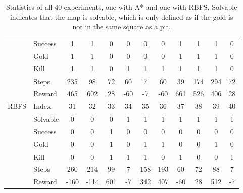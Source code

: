 \begin{table}[!h]
{\begin{tabular}{|l|l|c|c|c|c|c|c|c|c|c|c|}
		 & Success & 1 & 1 & 0 & 0 & 0 & 0 & 1 & 1 & 1 & 0 \\ \cline{2-12}
		 & Gold & 1 & 1 & 0 & 0 & 0 & 0 & 1 & 1 & 1 & 0 \\ \cline{2-12}
		 & Kill & 1 & 1 & 0 & 1 & 1 & 1 & 1 & 1 & 1 & 0 \\ \cline{2-12}
		 & Steps & 235 & 98 & 72 & 60 & 7 & 60 & 39 & 174 & 294 & 72 \\ \cline{2-12}
		 & Reward & 465 & 602 & 28 & -60 & -7 & -60 & 661 & 526 & 406 & 28 \\ \cline{2-12}
		\hline
		RBFS & Index & 31 & 32 & 33 & 34 & 35 & 36 & 37 & 38 & 39 & 40 \\ \cline{2-12}
		 & Solvable & 0 & 0 & 0 & 1 & 1 & 1 & 1 & 1 & 1 & 1 \\ \cline{2-12}
		 & Success & 0 & 0 & 1 & 0 & 0 & 0 & 0 & 0 & 0 & 0 \\ \cline{2-12}
		 & Gold & 0 & 0 & 1 & 0 & 1 & 1 & 0 & 0 & 1 & 0 \\ \cline{2-12}
		 & Kill & 0 & 0 & 1 & 1 & 1 & 0 & 1 & 0 & 0 & 1 \\ \cline{2-12}
		 & Steps & 260 & 214 & 99 & 7 & 158 & 193 & 60 & 72 & 88 & 7 \\ \cline{2-12}
		 & Reward & -160 & -114 & 601 & -7 & 342 & 407 & -60 & 28 & 512 & -7 \\ \cline{2-12}
		\hline
	    \end{tabular}
    }
    \caption{Statistics of all 40 experiments, one with A* and one with RBFS. Solvable indicates that the map is solvable, which is only defined as if the gold is not in the same square as a pit.}\label{tab:results}
\end{table}
